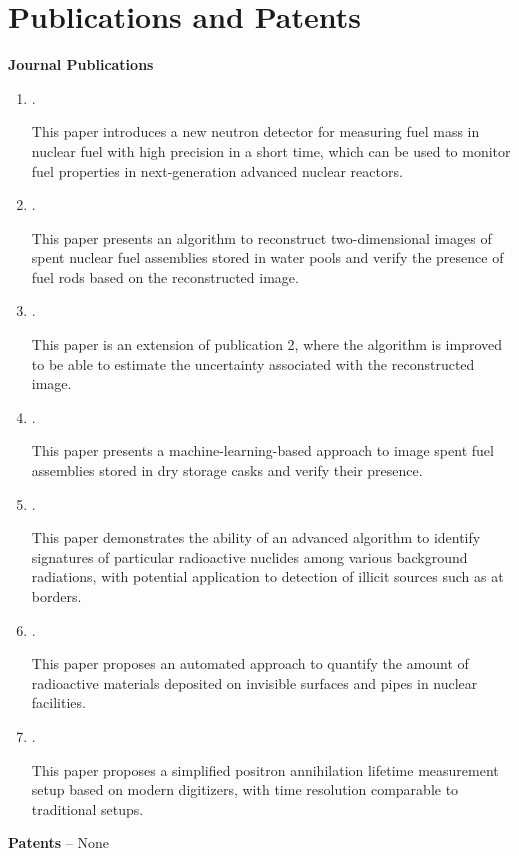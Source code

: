 \documentclass[letterpaper,11pt]{article} %
\begin{document}
\section{Publications and Patents}
\hspace{1.5em}\textbf{Journal Publications}
\begin{enumerate}
    \item {}. 
    
    This paper introduces a new neutron detector for measuring fuel mass in nuclear fuel with high precision in a short time, which can be used to monitor fuel properties in next-generation advanced nuclear reactors.
    \item {}. 
    
    This paper presents an algorithm to reconstruct two-dimensional images of spent nuclear fuel assemblies stored in water pools and verify the presence of fuel rods based on the reconstructed image.
    \item {}. 
    
    This paper is an extension of publication 2, where the algorithm is improved to be able to estimate the uncertainty associated with the reconstructed image.
    \item {}. 
    
    This paper presents a machine-learning-based approach to image spent fuel assemblies stored in dry storage casks and verify their presence.
    \item {}. 
    
    This paper demonstrates the ability of an advanced algorithm to identify signatures of particular radioactive nuclides among various background radiations, with potential application to detection of illicit sources such as at borders.
    \item {}. 
    
    This paper proposes an automated approach to quantify the amount of radioactive materials deposited on invisible surfaces and pipes in nuclear facilities. 
    \item {}. 
    
    This paper proposes a simplified positron annihilation lifetime measurement setup based on modern digitizers, with time resolution comparable to traditional setups.
\end{enumerate}
\hspace{1.5em}\textbf{Patents} -- None
\end{document}
